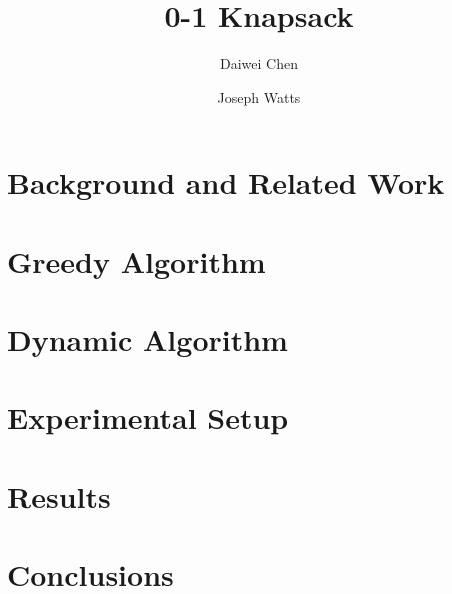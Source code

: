 \documentclass[10pt, letterpaper]{article}
\title{0-1 Knapsack}
\author{Daiwei Chen \and Joseph Watts}
\begin{document}
\maketitle
\begin{abstract}

\end{abstract}

\section{Background and Related Work}

\section{Greedy Algorithm}

\section{Dynamic Algorithm}

\section{Experimental Setup}

\section{Results}

\section{Conclusions}
\end{document}
